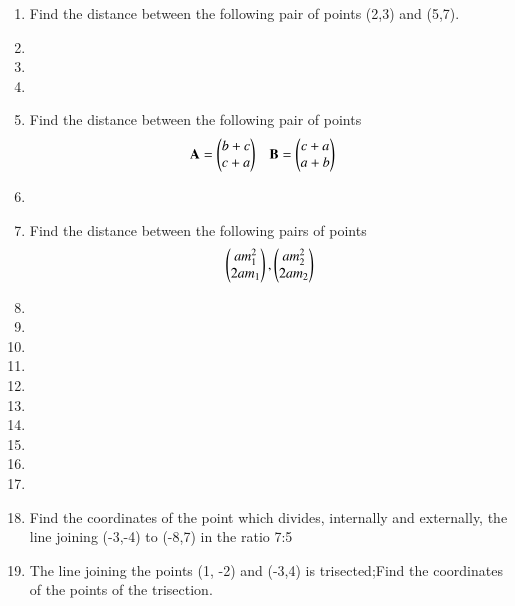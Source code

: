 \renewcommand{\theequation}{\theenumi}
\renewcommand{\thefigure}{\theenumi}
\begin{enumerate}[label=\thesubsection.\arabic*.,ref=\thesubsection.\theenumi]

\item Find the distance between the following pair of points (2,3) and (5,7). 
\\
\solution
%
\item 


\item 
\item 
\item 
Find the distance between the following pair of points
\begin{align}
\mathbf{A}&=\begin{pmatrix}b+c\\c+a\end{pmatrix} & \mathbf{B}&=\begin{pmatrix}c+a\\a+b\end{pmatrix}
\end{align}

\item 
\item 
Find the distance between the following pairs of points
\begin{align}
\begin{pmatrix}am_1^2\\2am_1\end{pmatrix}, \begin{pmatrix}am_2^2\\2am_2\end{pmatrix}
\end{align}
	
\item 
\item 
\item 
\item 
\item 
\item 
\item 
\item 
\item 
\item 

\item Find the coordinates of the point which divides, internally and externally, the line joining (-3,-4) to (-8,7) in the ratio 7:5
\\
\solution
 
%
\item The line joining the points (1, -2) and (-3,4) is  trisected;Find the coordinates of the points of the trisection.
\\
\solution
 


\end{enumerate}
